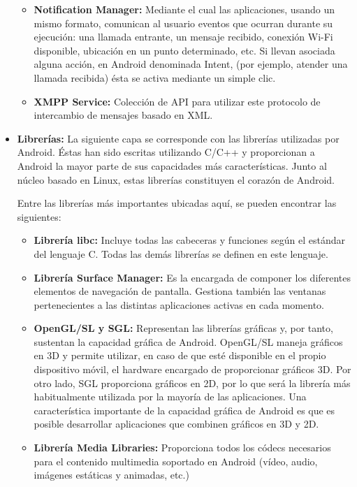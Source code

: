 \documentclass[letterpaper,12pt,openany,oneside]{book}
\begin{document}
\begin{itemize}
\begin{itemize}
\item    \textbf {Notification Manager:} Mediante el cual las aplicaciones, usando un mismo formato, comunican al usuario eventos que ocurran durante su ejecución: una llamada entrante, un mensaje recibido, conexión Wi-Fi disponible, ubicación en un punto determinado, etc. Si llevan asociada alguna acción, en Android denominada Intent, (por ejemplo, atender una llamada recibida) ésta se activa mediante un simple clic.
\item     \textbf { XMPP Service:} Colección de API para utilizar este protocolo de intercambio de mensajes basado en XML.

\end{itemize}

\item     \textbf {Librerías: }La siguiente capa se corresponde con las librerías utilizadas por Android. Éstas han sido escritas utilizando C/C++ y proporcionan a Android la mayor parte de sus capacidades más características. Junto al núcleo basado en Linux, estas librerías constituyen el corazón de Android.

              Entre las librerías más importantes ubicadas aquí, se pueden encontrar las siguientes:
\begin{itemize}

\item     \textbf  { Librería libc:} Incluye todas las cabeceras y funciones según el estándar del lenguaje C. Todas las demás librerías se definen en este lenguaje.

\item     \textbf { Librería Surface Manager:} Es la encargada de componer los diferentes elementos de navegación de pantalla. Gestiona también las ventanas pertenecientes a las distintas aplicaciones activas en cada momento.

\item     \textbf {  OpenGL/SL y SGL:} Representan las librerías gráficas y, por tanto, sustentan la capacidad gráfica de Android. OpenGL/SL maneja gráficos en 3D y permite utilizar, en caso de que esté disponible en el propio dispositivo móvil, el hardware encargado de proporcionar gráficos 3D. Por otro lado, SGL proporciona gráficos en 2D, por lo que será la librería más habitualmente utilizada por la mayoría de las aplicaciones. Una característica importante de la capacidad gráfica de Android es que es posible desarrollar aplicaciones que combinen gráficos en 3D y 2D.

\item     \textbf     {  Librería Media Libraries:} Proporciona todos los códecs necesarios para el contenido multimedia soportado en Android (vídeo, audio, imágenes estáticas y animadas, etc.)


\end{itemize}
\end{itemize}
\end{document}
